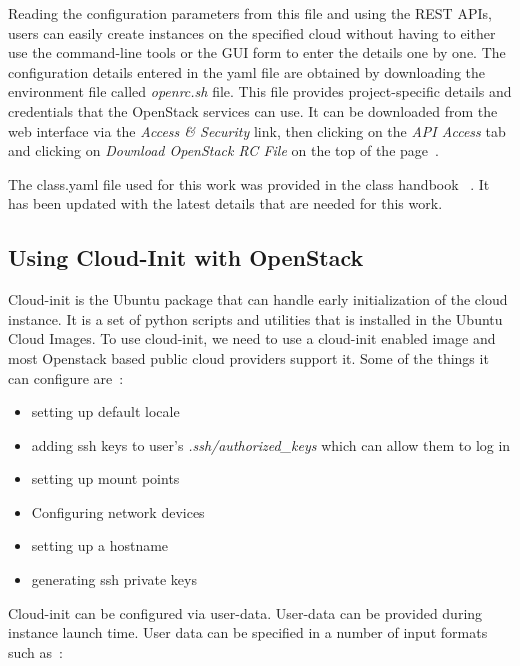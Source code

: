 Reading the configuration parameters from this file and using the REST APIs,
users can easily create instances on the specified cloud without having to
either use the command-line tools or the GUI form to enter the details one by
one. The configuration details entered in the yaml file are obtained by
downloading the environment file called \textit{openrc.sh} file. This file 
provides project-specific details and credentials that the OpenStack services 
can use. It can be downloaded from the web interface via the 
\textit{Access \& Security} link, then clicking on the 
\textit{API Access} tab and clicking on \textit{Download OpenStack RC File} 
on the top of the page~\cite{hid-sp18-516-www-openrc}. 

The class.yaml file used for this work was provided in the class handbook
~\cite{hid-sp18-516-las-handbook}. It has been updated with the latest 
details that are needed for this work. 

\subsection{Using Cloud-Init with OpenStack}
Cloud-init is the Ubuntu package that can handle early initialization of the
cloud instance. It is a set of python scripts and utilities that is installed 
in the Ubuntu Cloud Images. To use cloud-init, we need to use a cloud-init 
enabled image and most Openstack based public cloud providers support it. 
Some of the things it can configure are~\cite{hid-sp18-516-www-cloud-init}:

\begin{itemize}
\item setting up default locale
\item adding ssh keys to user's \textit{.ssh/authorized\_keys} which can 
allow them to log in
\item setting up mount points
\item Configuring network devices
\item setting up a hostname
\item generating ssh private keys
\end{itemize}

Cloud-init can be configured via user-data. User-data can be provided during
instance launch time. User data can be specified in a number of input formats
such as~\cite{hid-sp18-516-www-cloud-init}:

